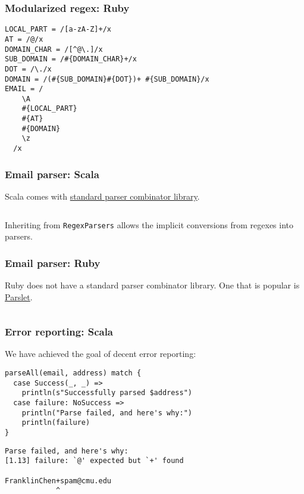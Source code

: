\begin{frame}[fragile]
  \frametitle{Modularized regex: Ruby}

  \begin{verbatim}
LOCAL_PART = /[a-zA-Z]+/x
AT = /@/x
DOMAIN_CHAR = /[^@\.]/x
SUB_DOMAIN = /#{DOMAIN_CHAR}+/x
DOT = /\./x
DOMAIN = /(#{SUB_DOMAIN}#{DOT})+ #{SUB_DOMAIN}/x
EMAIL = /
    \A
    #{LOCAL_PART}
    #{AT}
    #{DOMAIN}
    \z
  /x
  \end{verbatim}

\end{frame}


\begin{frame}[fragile]
  \frametitle{Email parser: Scala}

  Scala comes with \href{http://www.scala-lang.org/api/current/index.html\#scala.util.parsing.combinator.Parsers}{standard parser combinator library}.

  \inputminted{scala}{extra/EmailParsers.scala}

  Inheriting from \texttt{RegexParsers} allows the implicit conversions from regexes into parsers.
\end{frame}


\begin{frame}[fragile]
  \frametitle{Email parser: Ruby}

  Ruby does not have a standard parser combinator library. One that is popular is \href{http://kschiess.github.io/parslet/}{Parslet}.

  \inputminted{ruby}{ruby/lib/email_validator/parser.rb}
\end{frame}


\begin{frame}[fragile]
  \frametitle{Error reporting: Scala}

  We have achieved the goal of decent error reporting:

  \begin{verbatim}
parseAll(email, address) match {
  case Success(_, _) =>
    println(s"Successfully parsed $address")
  case failure: NoSuccess =>
    println("Parse failed, and here's why:")
    println(failure)
}
  \end{verbatim}

  \begin{verbatim}
Parse failed, and here's why:
[1.13] failure: `@' expected but `+' found

FranklinChen+spam@cmu.edu
            ^
  \end{verbatim}
\end{frame}

